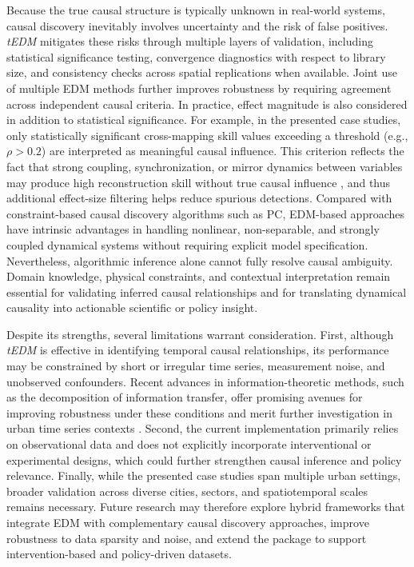\documentclass[authoryear,preprint,review,12pt]{elsarticle}
\begin{document}
Because the true causal structure is typically unknown in real-world systems, causal discovery inevitably involves uncertainty and the risk of false positives. \textit{tEDM} mitigates these risks through multiple layers of validation, including statistical significance testing, convergence diagnostics with respect to library size, and consistency checks across spatial replications when available. Joint use of multiple EDM methods further improves robustness by requiring agreement across independent causal criteria. In practice, effect magnitude is also considered in addition to statistical significance. For example, in the presented case studies, only statistically significant cross-mapping skill values exceeding a threshold (e.g., $\rho > 0.2$) are interpreted as meaningful causal influence. This criterion reflects the fact that strong coupling, synchronization, or mirror dynamics between variables may produce high reconstruction skill without true causal influence \citep{mur2013mirroring_effect,gao2023gccm}, and thus additional effect-size filtering helps reduce spurious detections. Compared with constraint-based causal discovery algorithms such as PC, EDM-based approaches have intrinsic advantages in handling nonlinear, non-separable, and strongly coupled dynamical systems without requiring explicit model specification. Nevertheless, algorithmic inference alone cannot fully resolve causal ambiguity. Domain knowledge, physical constraints, and contextual interpretation remain essential for validating inferred causal relationships and for translating dynamical causality into actionable scientific or policy insight.

Despite its strengths, several limitations warrant consideration. First, although \textit{tEDM} is effective in identifying temporal causal relationships, its performance may be constrained by short or irregular time series, measurement noise, and unobserved confounders. Recent advances in information-theoretic methods, such as the decomposition of information transfer, offer promising avenues for improving robustness under these conditions and merit further investigation in urban time series contexts \citep{sanchez2024surd}. Second, the current implementation primarily relies on observational data and does not explicitly incorporate interventional or experimental designs, which could further strengthen causal inference and policy relevance. Finally, while the presented case studies span multiple urban settings, broader validation across diverse cities, sectors, and spatiotemporal scales remains necessary. Future research may therefore explore hybrid frameworks that integrate EDM with complementary causal discovery approaches, improve robustness to data sparsity and noise, and extend the package to support intervention-based and policy-driven datasets.
\end{document}
